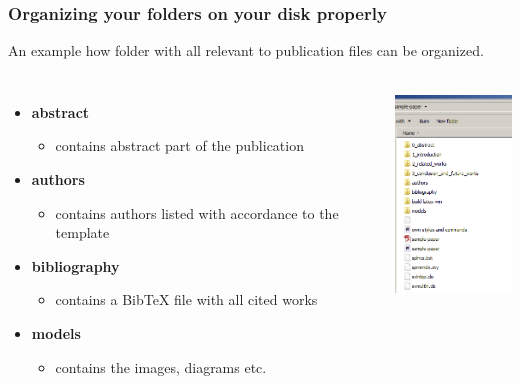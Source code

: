 \begin{frame}  \frametitle{Organizing your folders on your disk properly}
	
	An example how folder with all relevant to publication files can be organized.
	
	\begin{columns}
		\begin{itemize}
			\item \textbf{abstract}
				\begin{itemize}
					\item contains abstract part of the publication
				\end{itemize}
			\item \textbf{authors}
				\begin{itemize}
					\item contains authors listed with accordance to the template
				\end{itemize}					
			\item \textbf{bibliography}
			\begin{itemize}
				\item contains a BibTeX file with all cited works
			\end{itemize}					
			\item \textbf{models}
			\begin{itemize}					
				\item contains the images, diagrams etc.
			\end{itemize}					
		\end{itemize}

			\begin{center}
				\includegraphics[height=2.2in]{tips/images/sampleFolderStructure}
			\end{center}
	\end{columns}
		
\end{frame}

